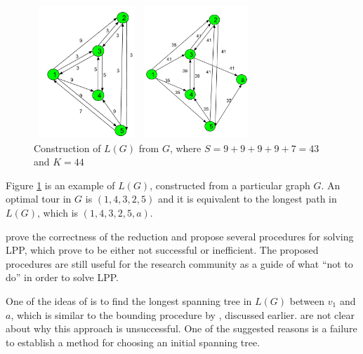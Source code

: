 \documentclass[a4paper,12pt]{article}
\begin{document}
\begin{figure}
\centering
\begin{minipage}{.5\textwidth}
  \centering
  \includegraphics[width=4cm, height=5cm]{images/G.png}
\end{minipage}%
\begin{minipage}{.5\textwidth}
  \centering
  \includegraphics[width=4cm, height=5cm]{images/LG.png}
\end{minipage}
\label{fig:lgconstruction}
\caption{Construction of $L(G)$ from $G$, where $S=9+9+9+9+7=43$ and $K=44$}
\end{figure}

Figure \ref{fig:lgconstruction} is an example of $L(G)$, constructed from a particular graph $G$. An optimal tour in $G$ is $(1,4,3,2,5)$ and it is equivalent to the longest path in $L(G)$, which is $(1,4,3,2,5,a)$.

\citet{Hardgrave62} prove the correctness of the reduction and propose several procedures for solving LPP, which prove to be either not successful or inefficient. The proposed procedures are still useful for the research community as a guide of what ``not to do'' in order to solve LPP.

One of the ideas of \citet{Hardgrave62} is to find the longest spanning tree in $L(G)$ between $v_{1}$ and $a$, which is similar to the bounding procedure by \citet{HeldK71}, discussed earlier. \citet{Hardgrave62} are not clear about why this approach is unsuccessful. One of the suggested reasons is a failure to establish a method for choosing an initial spanning tree.
\end{document}
